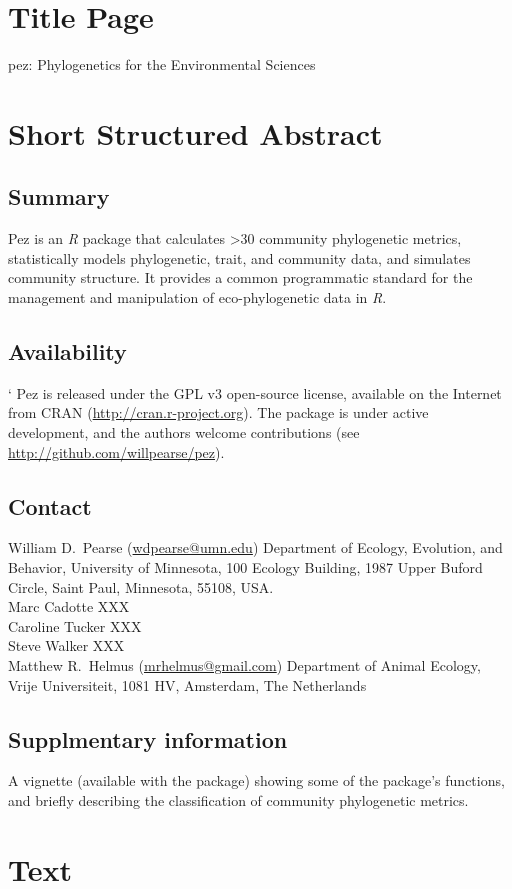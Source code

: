 \documentclass[11pt]{article} %
\begin{document}
\section*{Title Page}
pez: Phylogenetics for the Environmental Sciences   %
\section*{Short Structured Abstract}
\subsection*{Summary}
Pez is an \emph{R} package that calculates >30 community phylogenetic 
metrics, statistically models phylogenetic, trait, and community data,
and simulates community structure. It provides a common programmatic
standard for the management and manipulation of eco-phylogenetic data  %
in \emph{R}.
\subsection*{Availability}`
Pez is released under the GPL v3 open-source license, available on the
Internet from CRAN (\url{http://cran.r-project.org}). The package is
under active development, and the authors welcome contributions (see
\url{http://github.com/willpearse/pez}).
\subsection*{Contact}
William D.\ Pearse (\url{wdpearse@umn.edu}) Department of Ecology, Evolution, and Behavior, University of Minnesota, 100 Ecology Building, 1987 Upper Buford Circle, Saint Paul, Minnesota, 55108, USA.
\\Marc Cadotte XXX
\\Caroline Tucker XXX
\\Steve Walker XXX
\\Matthew R.\ Helmus (\url{mrhelmus@gmail.com}) Department of Animal Ecology, Vrije Universiteit, 1081 HV, Amsterdam, The Netherlands
\subsection*{Supplmentary information}
A vignette (available with the package) showing some of the package's
functions, and briefly describing the classification of community
phylogenetic metrics.
\section*{Text}
\end{document}
